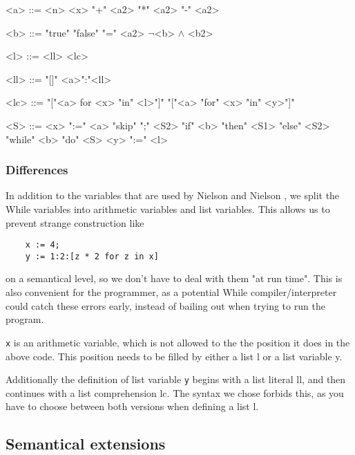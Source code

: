 \documentclass[12pt]{article}
\newcommand\mono\texttt
\newcommand{\metavar}[1]{\textlangle#1\textrangle}
\begin{document}
\begin{grammar}
    <a> ::= <n>
    \alt <x>
     "+" <a2>
     "*" <a2>
     "-" <a2>

    <b> ::= "true"
    \alt "false"
     "=" <a2>
    \alt $\lnot$<b>
     $\land$ <b2>

    <l> ::= <ll>
    \alt <lc>

    <ll> ::= "[]"
    \alt <a>":"<ll>

    <lc> ::= "["<a> for <x> "in" <l>"]"
    \alt "["<a> "for" <x> "in" <y>"]"

    <S> ::= <x> ":=" <a>
    \alt "skip"
     ";" <S2>
    \alt "if" <b> "then" <S1> "else" <S2>
    \alt "while" <b> "do" <S>
    \alt <y> ":=" <l>
\end{grammar}

\subsubsection{Differences}

In addition to the variables that are used by Nielson and Nielson \cite{wiley}, we split the While variables into arithmetic variables and list variables. This allows us to prevent strange construction like

\begin{lstlisting}
    x := 4;
    y := 1:2:[z * 2 for z in x]
\end{lstlisting}

on a semantical level, so we don't have to deal with them "at run time". This is also convenient for the programmer, as a potential While compiler/interpreter could catch these errors early, instead of bailing out when trying to run the program.

\mono{x} is an arithmetic variable, which is not allowed to the the position it does in the above code. This position needs to be filled by either a list \metavar{l} or a list variable \metavar{y}.

Additionally the definition of list variable \mono{y} begins with a list literal \metavar{ll}, and then continues with a list comprehension \metavar{lc}. The syntax we chose forbids this, as you have to choose between both versions when defining a list \metavar{l}.

\subsection{Semantical extensions} %
\end{document}
